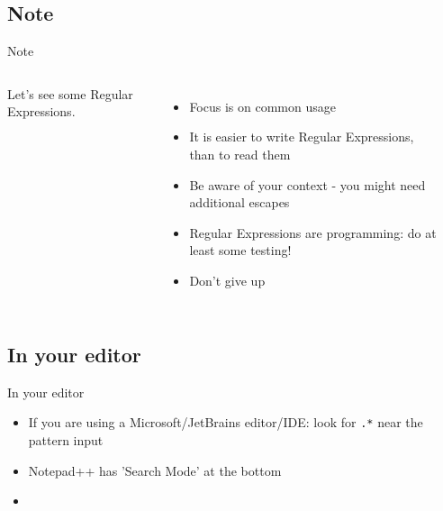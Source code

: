 \documentclass[english,aspectratio=169]{beamer}
\begin{document}
\subsection{Note}
\begin{frame}{Note}
\begin{columns}
        Let's see some Regular Expressions.
        \begin{itemize}
        \item Focus is on common usage
        \item It is easier to write Regular Expressions, than to read them
        \item Be aware of your context - you might need additional escapes
        \item Regular Expressions are programming: do at least some testing!
        \item Don't give up
        \end{itemize}
        \begin{center}
        \end{center}
\end{columns}
\end{frame}

\subsection{In your editor}
\begin{frame}{In your editor}

\begin{itemize}
\item If you are using a Microsoft/JetBrains editor/IDE: look for \texttt{.*} near the pattern input \\
        \begin{center}
        \end{center}
\item Notepad++ has 'Search Mode' at the bottom \\
        \begin{center}
        \end{center}
\item \textellipsis
\end{itemize}
\end{frame}
\end{document}
